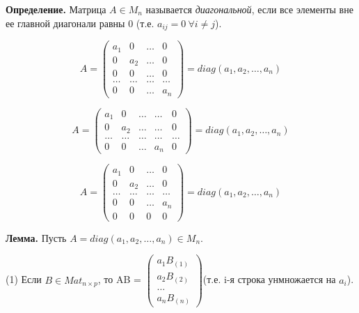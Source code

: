 \vspace{\baselineskip}
\textbf{Определение.} Матрица $A \in M_n$ называется \textit{диагональной}, если все элементы вне ее главной диагонали равны 0 (т.е. $a_{ij} = 0 \ \forall i \neq j$). 

\begin{equation*}A =  \begin{pmatrix} a_1 & 0 & \dots & 0 \\ 0 & a_2 & \dots & 0  \\ 0 & 0 & \dots & 0 \\ \dots & \dots & \dots & \dots \\ 0 & 0 & \dots & a_n \end{pmatrix} = diag(a_1, a_2, \dots , a_n) \end{equation*}

\begin{comment}
	В дальнейшем понятие \glqq диагональной матрицы\grqq \  будет использоваться также и для неквадратных матриц, условие то же: $a_{ij} = 0 \ \forall  i \neq j$
\end{comment}

\begin{equation*}A =  \begin{pmatrix} a_1 & 0 & \dots & \dots & 0 \\ 0 & a_2 & \dots & \dots & 0  \\ \dots & \dots & \dots & \dots & \dots \\ 0 & 0 & \dots & a_n & 0 \end{pmatrix} = diag(a_1, a_2, \dots , a_n) \end{equation*}

\begin{equation*}A =  \begin{pmatrix} a_1 & 0 & \dots & 0 \\ 0 & a_2 & \dots & 0  \\ \dots & \dots & \dots & \dots \\ 0 & 0 & \dots & a_n \\ 0 & 0 & 0 & 0 \end{pmatrix} = diag(a_1, a_2, \dots , a_n) \end{equation*}

\vspace{\baselineskip}
\textbf{Лемма.} Пусть $A = diag(a_1, a_2, \dots, a_n) \in M_n$.

\vspace{\baselineskip}
(1) Если $B \in Mat_{n \times p}$, то AB = $\begin{pmatrix} a_1 B_{(1)} \\ a_2 B_{(2)} \\ \dots \\ a_n B_{(n)} \end{pmatrix} $(т.е. i-я строка унмножается на $a_i$).

